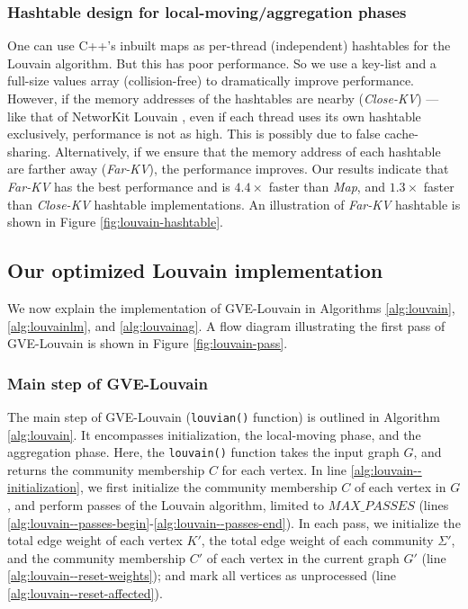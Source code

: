 \subsubsection{Hashtable design for local-moving/aggregation phases}

One can use C++'s inbuilt maps as per-thread (independent) hashtables for the Louvain algorithm. But this has poor performance. So we use a key-list and a full-size values array (collision-free) to dramatically improve performance. However, if the memory addresses of the hashtables are nearby (\textit{Close-KV}) --- like that of NetworKit Louvain \cite{staudt2016networkit}, even if each thread uses its own hashtable exclusively, performance is not as high. This is possibly due to false cache-sharing. Alternatively, if we ensure that the memory address of each hashtable are farther away (\textit{Far-KV}), the performance improves. Our results indicate that \textit{Far-KV} has the best performance and is $4.4\times$ faster than \textit{Map}, and $1.3\times$ faster than \textit{Close-KV} hashtable implementations. An illustration of \textit{Far-KV} hashtable is shown in Figure \ref{fig:louvain-hashtable}.







\subsection{Our optimized Louvain implementation}

We now explain the implementation of GVE-Louvain in Algorithms \ref{alg:louvain}, \ref{alg:louvainlm}, and \ref{alg:louvainag}. A flow diagram illustrating the first pass of GVE-Louvain is shown in Figure \ref{fig:louvain-pass}.


\subsubsection{Main step of GVE-Louvain}

The main step of GVE-Louvain (\texttt{louvian()} function) is outlined in Algorithm \ref{alg:louvain}. It encompasses initialization, the local-moving phase, and the aggregation phase. Here, the \texttt{louvain()} function takes the input graph $G$, and returns the community membership $C$ for each vertex. In line \ref{alg:louvain--initialization}, we first initialize the community membership $C$ of each vertex in $G$, and perform passes of the Louvain algorithm, limited to $MAX\_PASSES$ (lines \ref{alg:louvain--passes-begin}-\ref{alg:louvain--passes-end}). In each pass, we initialize the total edge weight of each vertex $K'$, the total edge weight of each community $\Sigma'$, and the community membership $C'$ of each vertex in the current graph $G'$ (line \ref{alg:louvain--reset-weights}); and mark all vertices as unprocessed (line \ref{alg:louvain--reset-affected}).

